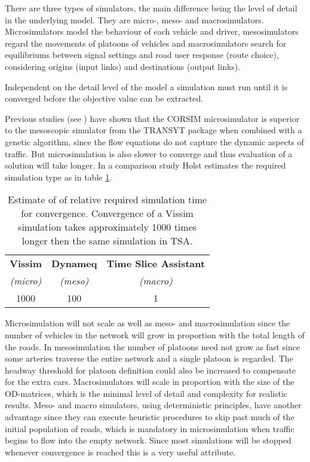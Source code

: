 There are three types of simulators, the main difference being the level of detail in the underlying model. They are micro-, meso- and macrosimulators. Microsimulators model the behaviour of each vehicle and driver, mesosimulators regard the movements of platoons of vehicles and macrosimulators search for equilibriums between signal settings and road user response (route choice), considering origins (input links) and destinations (output links).

Independent on the detail level of the model a simulation must run until it is converged before the objective value can be extracted. 

Previous studies (see \cite{corsimvstransyt}) have shown that the CORSIM microsimulator is superior to the mesoscopic simulator from the TRANSYT package when combined with a genetic algorithm, since the flow equations do not capture the dynamic aspects of traffic. But microsimulation is also slower to converge and thus evaluation of a solution will take longer. In a comparison study \cite{simcompare} Holst estimates the required simulation type as in table \ref{tab:convergespeed}.

\begin{table}[ht]
\centering
\begin{tabular}{c|c|c}
\textbf{Vissim} & \textbf{Dynameq} & \textbf{Time Slice Assistant} \\
\textit{(micro)} & \textit{(meso)} & \textit{(macro)} \\ \hline
1000 & 100 & 1
\end{tabular}
\caption{Estimate of of relative required simulation time for convergence. Convergence of a Vissim simulation takes approximately 1000 times longer then the same simulation in TSA.}
\label{tab:convergespeed}
\end{table}

Microsimulation will not scale as well as meso- and macrosimulation since the number of vehicles in the network will grow in proportion with the total length of the roads. In mesosimulation the number of platoons need not grow as fast since some arteries traverse the entire network and a single platoon is regarded. The headway threshold for platoon definition could also be increased to compensate for the extra cars. Macrosimulators will scale in proportion with the size of the OD-matrices, which is the minimal level of detail and complexity for realistic results. 
Meso- and macro simulators, using deterministic principles, have another advantage since they can execute heuristic procedures to skip past much of the initial population of roads, which is mandatory in microsimulation when traffic begins to flow into the empty network. Since most simulations will be stopped whenever convergence is reached this is a very useful attribute.

